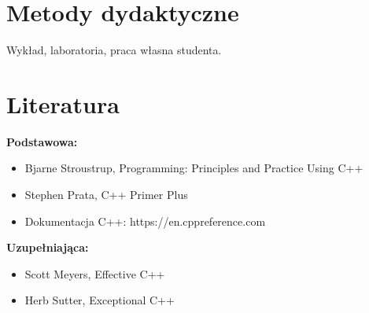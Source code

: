 \documentclass[12pt, a4paper]{article}
\begin{document}
\section{Metody dydaktyczne}

Wykład, laboratoria, praca własna studenta.

\section{Literatura}

\textbf{Podstawowa:}
\begin{itemize}
  \item Bjarne Stroustrup, Programming: Principles and Practice Using C++
  \item Stephen Prata, C++ Primer Plus
  \item Dokumentacja C++: https://en.cppreference.com
\end{itemize}

\textbf{Uzupełniająca:}
\begin{itemize}
  \item Scott Meyers, Effective C++
  \item Herb Sutter, Exceptional C++
\end{itemize}
\end{document}
